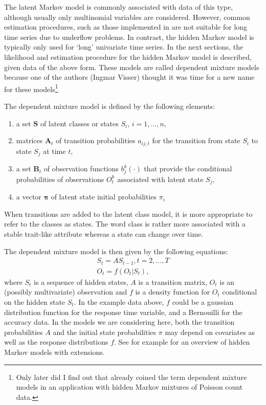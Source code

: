 \documentclass[article]{jss}
\newcommand{\vc}{\mathbf}
\newcommand{\mat}{\mathbf}
\begin{document}
The latent Markov model is commonly associated with data of this type,
although usually only multinomial variables are considered.  However,
common estimation procedures, such as those implemented in
\citet{Pol1996} are not suitable for long time series due to underflow
problems.  In contrast, the hidden Markov model is typically only used
for `long' univariate time series.  In the next sections, the
likelihood and estimation procedure for the hidden Markov model is
described, given data of the above form.  These models are called
dependent mixture models because one of the authors (Ingmar Visser)
thought it was time for a new name for these models\footnote{Only
later did I find out that \citet{Leroux1992} already coined the term
dependent mixture models in an application with hidden Markov mixtures
of Poisson count data.}

The dependent mixture model is defined by the following elements:
\begin{enumerate}
	
	\item a set $\vc{S}$ of latent classes or states $S_{i},\, i=1,
	\ldots , n$,
	
	\item matrices $\mat{A}_t$ of transition probabilities $a_{ij,t}$ for
	the transition from state $S_{i}$ to state $S_{j}$ at time $t$,
	
	\item a set $\vc{B}_t$ of observation functions $b_j^k(\cdot)$ that
	provide the conditional probabilities of observations $O_{t}^k$ 
	associated with latent state $S_{j}$,
	
	\item a vector $\pmb{\pi}$ of latent state initial probabilities
	$\pi_{i}$
\end{enumerate}
When transitions are added to the latent class model, it is more
appropriate to refer to the classes as states.  The word class is
rather more associated with a stable trait-like attribute whereas a
state can change over time. 

The dependent mixture model is then given by the following equations: 
\begin{align}
	S_{t} = A S_{t-1}, t=2, \ldots, T \\
	O_{t} = f(O_{t}|S_{t}),
\end{align}
where $S_{t}$ is a sequence of hidden states, $A$ is a transition
matrix, $O_{t}$ is an (possibly multivariate) observation and $f$ is a
density function for $O_{t}$ conditional on the hidden state $S_{t}$.
In the example data above, $f$ could be a gaussian distribution
function for the response time variable, and a Bernouilli for the
accuracy data.  In the models we are considering here, both the
transition probabilities $A$ and the initial state probabilities $\pi$
may depend on covariates as well as the response distributions $f$. 
See for example \citet{Fruhwirth2006} for an overview of 
hidden Markov models with extensions. 
\end{document}
